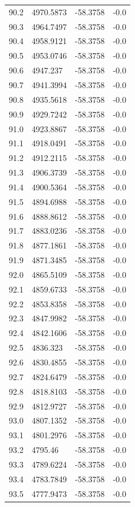 \begin{table}[H]
\begin{tabular}{llll}
90.2 & 4970.5873 & -58.3758 & -0.0 \\
90.3 & 4964.7497 & -58.3758 & -0.0 \\
90.4 & 4958.9121 & -58.3758 & -0.0 \\
90.5 & 4953.0746 & -58.3758 & -0.0 \\
90.6 & 4947.237 & -58.3758 & -0.0 \\
90.7 & 4941.3994 & -58.3758 & -0.0 \\
90.8 & 4935.5618 & -58.3758 & -0.0 \\
90.9 & 4929.7242 & -58.3758 & -0.0 \\
91.0 & 4923.8867 & -58.3758 & -0.0 \\
91.1 & 4918.0491 & -58.3758 & -0.0 \\
91.2 & 4912.2115 & -58.3758 & -0.0 \\
91.3 & 4906.3739 & -58.3758 & -0.0 \\
91.4 & 4900.5364 & -58.3758 & -0.0 \\
91.5 & 4894.6988 & -58.3758 & -0.0 \\
91.6 & 4888.8612 & -58.3758 & -0.0 \\
91.7 & 4883.0236 & -58.3758 & -0.0 \\
91.8 & 4877.1861 & -58.3758 & -0.0 \\
91.9 & 4871.3485 & -58.3758 & -0.0 \\
92.0 & 4865.5109 & -58.3758 & -0.0 \\
92.1 & 4859.6733 & -58.3758 & -0.0 \\
92.2 & 4853.8358 & -58.3758 & -0.0 \\
92.3 & 4847.9982 & -58.3758 & -0.0 \\
92.4 & 4842.1606 & -58.3758 & -0.0 \\
92.5 & 4836.323 & -58.3758 & -0.0 \\
92.6 & 4830.4855 & -58.3758 & -0.0 \\
92.7 & 4824.6479 & -58.3758 & -0.0 \\
92.8 & 4818.8103 & -58.3758 & -0.0 \\
92.9 & 4812.9727 & -58.3758 & -0.0 \\
93.0 & 4807.1352 & -58.3758 & -0.0 \\
93.1 & 4801.2976 & -58.3758 & -0.0 \\
93.2 & 4795.46 & -58.3758 & -0.0 \\
93.3 & 4789.6224 & -58.3758 & -0.0 \\
93.4 & 4783.7849 & -58.3758 & -0.0 \\
93.5 & 4777.9473 & -58.3758 & -0.0 \\

\end{tabular}
\end{table}
